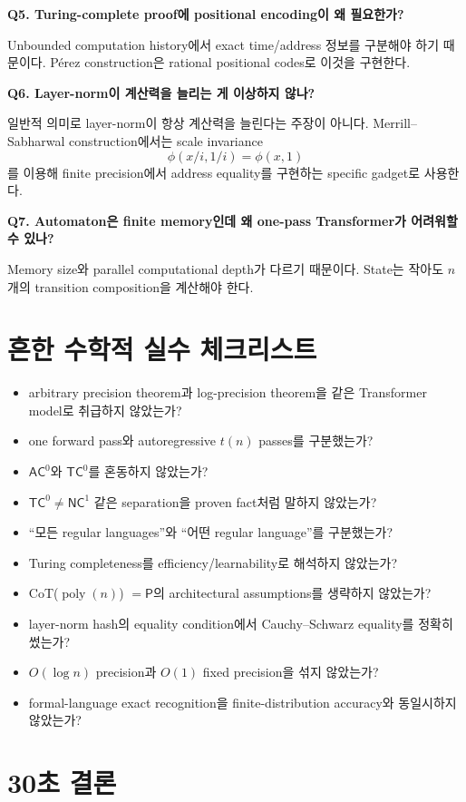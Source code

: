 \documentclass[11pt,a4paper,oneside,openany]{memoir}
\theoremstyle{definition}
\newcommand{\poly}{\operatorname{poly}}
\newcommand{\AC}{\mathsf{AC}}
\newcommand{\TC}{\mathsf{TC}}
\newcommand{\NC}{\mathsf{NC}}
\newcommand{\Pclass}{\mathsf{P}}
\begin{document}
\textbf{Q5. Turing-complete proof에 positional encoding이 왜 필요한가?}

Unbounded computation history에서 exact time/address 정보를 구분해야 하기 때문이다. Pérez construction은 rational positional codes로 이것을 구현한다.

\textbf{Q6. Layer-norm이 계산력을 늘리는 게 이상하지 않나?}

일반적 의미로 layer-norm이 항상 계산력을 늘린다는 주장이 아니다. Merrill--Sabharwal construction에서는 scale invariance
\[
\phi(x/i,1/i)=\phi(x,1)
\]
를 이용해 finite precision에서 address equality를 구현하는 specific gadget로 사용한다.

\textbf{Q7. Automaton은 finite memory인데 왜 one-pass Transformer가 어려워할 수 있나?}

Memory size와 parallel computational depth가 다르기 때문이다. State는 작아도 $n$개의 transition composition을 계산해야 한다.

\section{흔한 수학적 실수 체크리스트}

\begin{itemize}
  \item arbitrary precision theorem과 log-precision theorem을 같은 Transformer model로 취급하지 않았는가?
  \item one forward pass와 autoregressive $t(n)$ passes를 구분했는가?
  \item $\AC^0$와 $\TC^0$를 혼동하지 않았는가?
  \item $\TC^0\neq\NC^1$ 같은 separation을 proven fact처럼 말하지 않았는가?
  \item ``모든 regular languages''와 ``어떤 regular language''를 구분했는가?
  \item Turing completeness를 efficiency/learnability로 해석하지 않았는가?
  \item CoT($\poly(n)$) $=\Pclass$의 architectural assumptions를 생략하지 않았는가?
  \item layer-norm hash의 equality condition에서 Cauchy--Schwarz equality를 정확히 썼는가?
  \item $O(\log n)$ precision과 $O(1)$ fixed precision을 섞지 않았는가?
  \item formal-language exact recognition을 finite-distribution accuracy와 동일시하지 않았는가?
\end{itemize}

\section{30초 결론}
\end{document}
